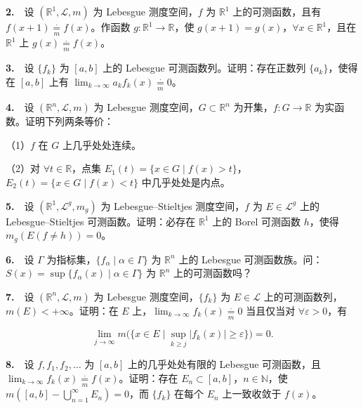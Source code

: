 \documentclass[11pt,a4paper]{article}
\begin{document}
\par{}\noindent \textbf{2.}　设 \((\mathbb R^1,\mathcal L,m)\) 为 Lebesgue 测度空间，\(f\) 为 \(\mathbb R^1\) 上的可测函数，且有 \(f(x+1)\underset{m}{\overset{\cdot}{=}} f(x)\)。作函数 \(g:\mathbb R^1\to\mathbb R\)，使 \(g(x+1)=g(x)\)，\(\forall x\in\mathbb R^1\)，且在 \(\mathbb R^1\) 上 \(g(x)\underset{m}{\overset{\cdot}{=}} f(x)\)。

\par{}\noindent \textbf{3.}　设 \(\{f_k\}\) 为 \([a,b]\) 上的 Lebesgue 可测函数列。证明：存在正数列 \(\{a_k\}\)，使得在 \([a,b]\) 上有 \(\lim_{k\to\infty}a_k f_k(x)\underset{m}{\overset{\cdot}{=}} 0\)。

\par{}\noindent \textbf{4.}　设 \((\mathbb R^n,\mathcal L,m)\) 为 Lebesgue 测度空间，\(G\subset\mathbb R^n\) 为开集，\(f:G\to\mathbb R\) 为实函数。证明下列两条等价：

（1）\(f\) 在 \(G\) 上几乎处处连续。

（2）对 \(\forall t\in\mathbb R\)，点集 \(E_1(t)=\{x\in G\mid f(x)>t\}\)，\(E_2(t)=\{x\in G\mid f(x)<t\}\) 中几乎处处是内点。

\par{}\noindent \textbf{5.}　设 \((\mathbb R^1,\mathcal L^g,m_g)\) 为 Lebesgue--Stieltjes 测度空间，\(f\) 为 \(E\in\mathcal L^g\) 上的 Lebesgue--Stieltjes 可测函数。证明：必存在 \(\mathbb R^1\) 上的 Borel 可测函数 \(h\)，使得 \(m_g(E(f\ne h))=0\)。

\par{}\noindent \textbf{6.}　设 \(\Gamma\) 为指标集，\(\{f_\alpha\mid\alpha\in\Gamma\}\) 为 \(\mathbb R^n\) 上的 Lebesgue 可测函数族。问：\(S(x)=\sup\{f_\alpha(x)\mid\alpha\in\Gamma\}\) 为 \(\mathbb R^n\) 上的可测函数吗？

\par{}\noindent \textbf{7.}　设 \((\mathbb R^n,\mathcal L,m)\) 为 Lebesgue 测度空间，\(\{f_k\}\) 为 \(E\in\mathcal L\) 上的可测函数列，\(m(E)<+\infty\)。证明：在 \(E\) 上，\(\lim_{k\to\infty} f_k(x)\underset{m}{\overset{\cdot}{=}} 0\) 当且仅当对 \(\forall\varepsilon>0\)，有

\[
\lim_{j\to\infty}m\bigl(\{x\in E\mid \sup_{k\ge j}|f_k(x)|\ge\varepsilon\}\bigr)=0.
\]

\par{}\noindent \textbf{8.}　设 \(f,f_1,f_2,\ldots\) 为 \([a,b]\) 上的几乎处处有限的 Lebesgue 可测函数，且 \(\lim_{k\to\infty}f_k(x)\underset{m}{\overset{\cdot}{=}} f(x)\)。证明：存在 \(E_n\subset[a,b]\)，\(n\in\mathbb N\)，使 \(m([a,b]-\bigcup_{n=1}^\infty E_n)=0\)，而 \(\{f_k\}\) 在每个 \(E_n\) 上一致收敛于 \(f(x)\)。
\end{document}
